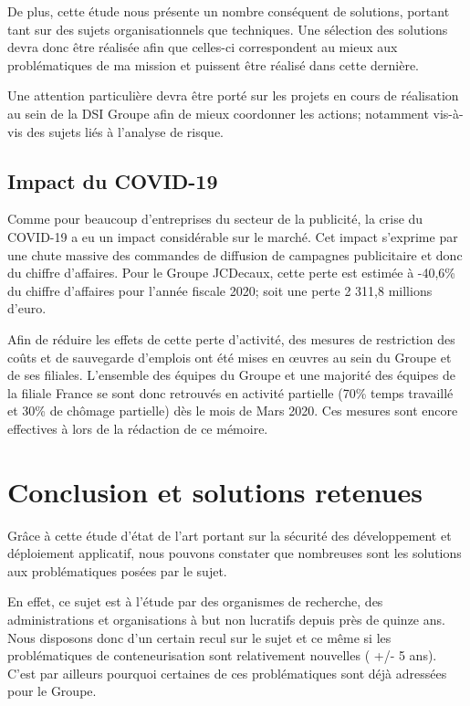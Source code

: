 De plus, cette étude nous présente un nombre conséquent de solutions, portant tant sur des sujets organisationnels que
techniques. Une sélection des solutions devra donc être réalisée afin que celles-ci correspondent au mieux aux problématiques
de ma mission et puissent être réalisé dans cette dernière.

Une attention particulière devra être porté sur les projets en cours de réalisation au sein de la \ac{DSI} Groupe afin de mieux 
coordonner les actions; notamment vis-à-vis des sujets liés à l'analyse de risque. 

\newpage


\subsection{Impact du COVID-19}
Comme pour beaucoup d'entreprises du secteur de la publicité, la crise du COVID-19 a eu un impact considérable sur le
marché. Cet impact s'exprime par une chute massive des commandes de diffusion de campagnes publicitaire et donc du 
chiffre d'affaires.
\newline Pour le Groupe JCDecaux, cette perte est estimée à -40,6\% du chiffre d'affaires pour l'année fiscale 2020; soit
une perte 2 311,8 millions d'euro\autocite{jcdecaux_resultfin_2020}.

Afin de réduire les effets de cette perte d'activité, des mesures de restriction des coûts et de sauvegarde d'emplois 
ont été mises en œuvres au sein du Groupe et de ses filiales. L'ensemble des équipes du Groupe et une majorité des équipes
de la filiale France se sont donc retrouvés en activité partielle (70\% temps travaillé et 30\% de chômage partielle) 
dès le mois de Mars 2020. Ces mesures sont encore effectives à lors de la rédaction de ce mémoire.

\section{Conclusion et solutions retenues}
Grâce à cette étude d'état de l'art portant sur la sécurité des développement et déploiement applicatif, nous pouvons 
constater que nombreuses sont les solutions aux problématiques posées par le sujet. 

En effet, ce sujet est à l'étude par des organismes de recherche, des administrations et organisations à but 
non lucratifs depuis près de quinze ans. Nous disposons donc d'un certain recul sur le sujet et ce même si les 
problématiques de conteneurisation sont relativement nouvelles ( +/- 5 ans).
C'est par ailleurs pourquoi certaines de ces problématiques sont déjà adressées pour le Groupe.

